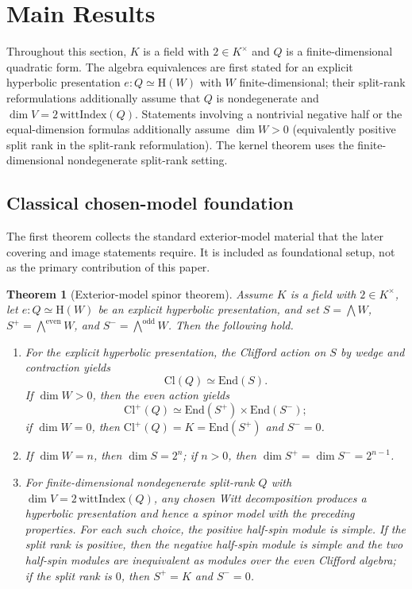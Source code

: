 \documentclass{birkjour}
\theoremstyle{plain}
\newtheorem{theorem}{Theorem}[section]
\theoremstyle{definition}
\theoremstyle{remark}
\numberwithin{equation}{section}
\newcommand{\Cl}{\mathrm{Cl}}
\newcommand{\End}{\mathrm{End}}
\newcommand{\Hyp}{\mathrm{H}}
\newcommand{\wedgeEven}{\bigwedge^{\mathrm{even}} W}
\newcommand{\wedgeOdd}{\bigwedge^{\mathrm{odd}} W}
\begin{document}
\section{Main Results}
\label{sec:results}

Throughout this section, $K$ is a field with $2\in K^\times$ and $Q$ is a
finite-dimensional quadratic form. The algebra equivalences are first stated
for an explicit hyperbolic presentation $e:Q \simeq \Hyp(W)$ with
$W$ finite-dimensional; their split-rank reformulations additionally assume
that $Q$ is nondegenerate and $\dim V = 2\,\mathrm{wittIndex}(Q)$. Statements
involving a nontrivial negative half or the equal-dimension formulas
additionally assume $\dim W>0$ (equivalently positive split rank in the
split-rank reformulation). The kernel theorem uses the finite-dimensional
nondegenerate split-rank setting.

\subsection*{Classical chosen-model foundation}

The first theorem collects the standard exterior-model material that the later
covering and image statements require. It is included as foundational setup, not
as the primary contribution of this paper.

\begin{theorem}[Exterior-model spinor theorem]
\label{thm:chosen-spinor-package}
Assume $K$ is a field with $2\in K^\times$, let
$e:Q \simeq \Hyp(W)$ be an explicit hyperbolic presentation, and set
$S=\bigwedge W$, $S^+=\wedgeEven$, and $S^-=\wedgeOdd$. Then the following hold.
\begin{enumerate}
\item For the explicit hyperbolic presentation, the Clifford action on $S$ by
  wedge and contraction yields
  \[
    \Cl(Q)\simeq \End(S).
  \]
  If $\dim W>0$, then the even action yields
  \[
    \Cl^+(Q)\simeq \End(S^+) \times \End(S^-);
  \]
  if $\dim W=0$, then $\Cl^+(Q)=K=\End(S^+)$ and $S^-=0$.
\item If $\dim W=n$, then $\dim S = 2^n$; if $n>0$, then
  $\dim S^+ = \dim S^- = 2^{n-1}$.
\item For finite-dimensional nondegenerate split-rank $Q$ with
  $\dim V = 2\,\mathrm{wittIndex}(Q)$, any chosen Witt decomposition produces a
  hyperbolic presentation and hence a spinor model with the preceding
  properties. For each such choice, the positive half-spin module is simple. If
  the split rank is positive, then the negative half-spin module is simple and
  the two half-spin modules are inequivalent as modules over the even Clifford
  algebra; if the split rank is $0$, then $S^+=K$ and $S^-=0$.
\end{enumerate}
\end{theorem}
\end{document}
